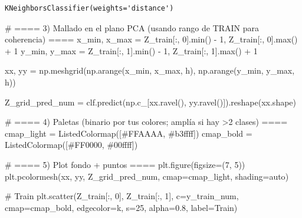 \documentclass[
  letterpaper,
  DIV=11,
  numbers=noendperiod]{scrartcl}
\newenvironment{Shaded}{\begin{snugshade}}{\end{snugshade}}
\newcommand{\BuiltInTok}[1]{\textcolor[rgb]{0.00,0.23,0.31}{#1}}
\newcommand{\CommentTok}[1]{\textcolor[rgb]{0.37,0.37,0.37}{#1}}
\newcommand{\DecValTok}[1]{\textcolor[rgb]{0.68,0.00,0.00}{#1}}
\newcommand{\FloatTok}[1]{\textcolor[rgb]{0.68,0.00,0.00}{#1}}
\newcommand{\NormalTok}[1]{\textcolor[rgb]{0.00,0.23,0.31}{#1}}
\newcommand{\OperatorTok}[1]{\textcolor[rgb]{0.37,0.37,0.37}{#1}}
\newcommand{\StringTok}[1]{\textcolor[rgb]{0.13,0.47,0.30}{#1}}
\begin{document}
\begin{verbatim}
KNeighborsClassifier(weights='distance')
\end{verbatim}

\begin{Shaded}
\begin{Highlighting}[]
\CommentTok{\# ==== 3) Mallado en el plano PCA (usando rango de TRAIN para coherencia) ====}
\NormalTok{x\_min, x\_max }\OperatorTok{=}\NormalTok{ Z\_train[:, }\DecValTok{0}\NormalTok{].}\BuiltInTok{min}\NormalTok{() }\OperatorTok{{-}} \DecValTok{1}\NormalTok{, Z\_train[:, }\DecValTok{0}\NormalTok{].}\BuiltInTok{max}\NormalTok{() }\OperatorTok{+} \DecValTok{1}
\NormalTok{y\_min, y\_max }\OperatorTok{=}\NormalTok{ Z\_train[:, }\DecValTok{1}\NormalTok{].}\BuiltInTok{min}\NormalTok{() }\OperatorTok{{-}} \DecValTok{1}\NormalTok{, Z\_train[:, }\DecValTok{1}\NormalTok{].}\BuiltInTok{max}\NormalTok{() }\OperatorTok{+} \DecValTok{1}

\NormalTok{xx, yy }\OperatorTok{=}\NormalTok{ np.meshgrid(np.arange(x\_min, x\_max, h),}
\NormalTok{                     np.arange(y\_min, y\_max, h))}

\NormalTok{Z\_grid\_pred\_num }\OperatorTok{=}\NormalTok{ clf.predict(np.c\_[xx.ravel(), yy.ravel()]).reshape(xx.shape)}

\CommentTok{\# ==== 4) Paletas (binario por tus colores; amplía si hay \textgreater{}2 clases) ====}
\NormalTok{cmap\_light }\OperatorTok{=}\NormalTok{ ListedColormap([}\StringTok{\textquotesingle{}\#FFAAAA\textquotesingle{}}\NormalTok{, }\StringTok{\textquotesingle{}\#b3ffff\textquotesingle{}}\NormalTok{])}
\NormalTok{cmap\_bold  }\OperatorTok{=}\NormalTok{ ListedColormap([}\StringTok{\textquotesingle{}\#FF0000\textquotesingle{}}\NormalTok{, }\StringTok{\textquotesingle{}\#00ffff\textquotesingle{}}\NormalTok{])}

\CommentTok{\# ==== 5) Plot fondo + puntos ====}
\NormalTok{plt.figure(figsize}\OperatorTok{=}\NormalTok{(}\DecValTok{7}\NormalTok{, }\DecValTok{5}\NormalTok{))}
\NormalTok{plt.pcolormesh(xx, yy, Z\_grid\_pred\_num, cmap}\OperatorTok{=}\NormalTok{cmap\_light, shading}\OperatorTok{=}\StringTok{\textquotesingle{}auto\textquotesingle{}}\NormalTok{)}

\CommentTok{\# Train}
\NormalTok{plt.scatter(Z\_train[:, }\DecValTok{0}\NormalTok{], Z\_train[:, }\DecValTok{1}\NormalTok{], c}\OperatorTok{=}\NormalTok{y\_train\_num, cmap}\OperatorTok{=}\NormalTok{cmap\_bold,}
\NormalTok{            edgecolor}\OperatorTok{=}\StringTok{\textquotesingle{}k\textquotesingle{}}\NormalTok{, s}\OperatorTok{=}\DecValTok{25}\NormalTok{, alpha}\OperatorTok{=}\FloatTok{0.8}\NormalTok{, label}\OperatorTok{=}\StringTok{\textquotesingle{}Train\textquotesingle{}}\NormalTok{)}


\end{Highlighting}
\end{Shaded}
\end{document}
